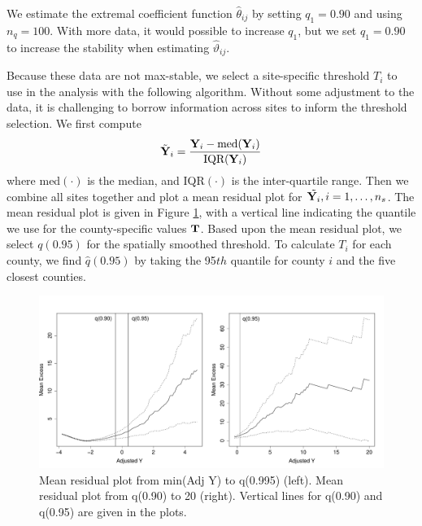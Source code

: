 \documentclass[11pt]{article}
\begin{document}
We estimate the extremal coefficient function $\hat{\theta}_{ij}$ by setting $q_1 = 0.90$ and using $n_q = 100$.
With more data, it would possible to increase $q_1$, but we set $q_1 = 0.90$ to increase the stability when estimating $\hat{\vartheta}_{ij}$.

Because these data are not max-stable, we select a site-specific threshold $T_i$ to use in the analysis with the following algorithm.
Without some adjustment to the data, it is challenging to borrow information across sites to inform the threshold selection.
We first compute
\begin{align}
  \tilde{\mbox{\bf Y}}_i = \frac{\mbox{\bf Y}_i - \text{med}(\mbox{\bf Y}_i)}{\text{IQR}(\mbox{\bf Y}_i)}
\end{align}
where med$(\cdot)$ is the median, and IQR$(\cdot)$ is the inter-quartile range.
Then we combine all sites together and plot a mean residual plot for $\tilde{\mbox{\bf Y}_i}, i = 1, \ldots, n_s$.
The mean residual plot is given in Figure \ref{fig:mrlthresh}, with a vertical line indicating the quantile we use for the county-specific values $\mbox{\bf T}$.
Based upon the mean residual plot, we select $q(0.95)$ for the spatially smoothed threshold.
To calculate $T_i$ for each county, we find $\hat{q}(0.95)$ by taking the 95$th$ quantile for county $i$ and the five closest counties.

\begin{figure}[htbp]
  \centering
  \includegraphics[width = \linewidth]{plots/mrl-plots-fire.pdf}  %
  \caption{Mean residual plot from min(Adj Y) to q(0.995) (left). Mean residual plot from q(0.90) to 20 (right). Vertical lines for q(0.90) and q(0.95) are given in the plots.}
  \label{fig:mrlthresh}
\end{figure}
\end{document}
